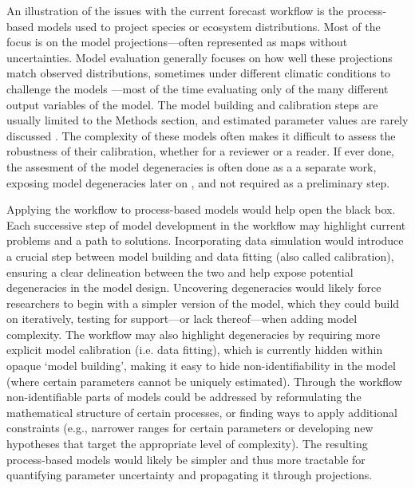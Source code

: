 \documentclass[11pt]{article}
\begin{document}
An illustration of the issues with the current forecast workflow is the process-based models used to project species or ecosystem distributions. Most of the focus is on the model projections---often represented as maps without uncertainties. Model evaluation generally focuses on how well these projections match observed distributions, sometimes under different climatic conditions to challenge the models \citep{VanderMeersch2025a}---most of the time evaluating only of the many different output variables of the model. The model building and calibration steps are usually limited to the Methods section, and estimated parameter values are rarely discussed \citep[e.g.][]{Conradi2024, VanderMeersch2025a}. The complexity of these models often makes it difficult to assess the robustness of their calibration, whether for a reviewer or a reader. If ever done, the assesment of the model degeneracies is often done as a a separate work, exposing model degeneracies later on \citep{VanderMeersch2025b}, and not required as a preliminary step. 

Applying the workflow to process-based models would help open the black box.
Each successive step of model development in the workflow may highlight current problems and a path to solutions. Incorporating data simulation would introduce a crucial step between model building and data fitting (also called calibration), ensuring a clear delineation between the two and help expose potential degeneracies in the model design. %
Uncovering degeneracies would likely force researchers to begin with a simpler version of the model, which they could build on iteratively, testing for support---or lack thereof---when adding model complexity. The workflow may also highlight degeneracies by requiring more explicit model calibration (i.e. data fitting), %
which is currently hidden within opaque `model building', making it easy to hide non-identifiability in the model (where certain parameters cannot be uniquely estimated). Through the workflow non-identifiable parts of models could be addressed by reformulating the mathematical structure of certain processes, or finding ways to apply additional constraints (e.g., narrower ranges for certain parameters or developing new hypotheses that target the appropriate level of complexity). The resulting process-based models would likely be simpler and thus more tractable for quantifying parameter uncertainty and propagating it through projections. 
\end{document}
